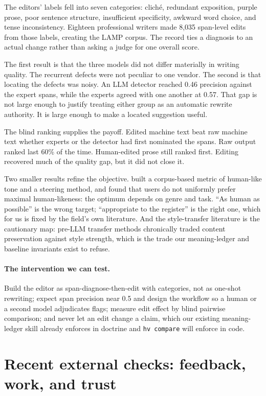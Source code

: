 The editors' labels fell into seven categories: clich\'e, redundant exposition,
purple prose, poor sentence structure, insufficient specificity, awkward word
choice, and tense inconsistency. Eighteen professional writers made 8{,}035
span-level edits from those labels, creating the LAMP corpus. The record ties a
diagnosis to an actual change rather than asking a judge for one overall score.

The first result is that the three models did not differ materially in writing
quality. The recurrent defects were not peculiar to one vendor. The second is
that locating the defects was noisy. An LLM detector reached 0.46 precision
against the expert spans, while the experts agreed with one another at 0.57.
That gap is not large enough to justify treating either group as an automatic
rewrite authority. It is large enough to make a located suggestion useful.

The blind ranking supplies the payoff. Edited machine text beat raw machine
text whether experts or the detector had first nominated the spans. Raw output
ranked last 60\% of the time. Human-edited prose still ranked first. Editing
recovered much of the quality gap, but it did not close it.

Two smaller results refine the objective. \citet{cheng2025humt} built a
corpus-based metric of human-like tone and a steering method, and found
that users do not uniformly prefer maximal human-likeness: the optimum
depends on genre and task. ``As human as possible'' is the wrong target;
``appropriate to the register'' is the right one, which for us is fixed by
the field's own literature. And the style-transfer literature
\citep{jin2022style} is the cautionary map: pre-LLM transfer methods
chronically traded content preservation against style strength, which is
the trade our meaning-ledger and baseline invariants exist to refuse.

\paragraph{The intervention we can test.} Build the editor as
span-diagnose-then-edit with categories, not as one-shot rewriting; expect
span precision near 0.5 and design the workflow so a human or a second
model adjudicates flags; measure edit effect by blind pairwise comparison;
and never let an edit change a claim, which our existing meaning-ledger
skill already enforces in doctrine and \texttt{hv compare} will enforce in
code.

\section{Recent external checks: feedback, work, and trust}
\label{sec:lit-recent}

